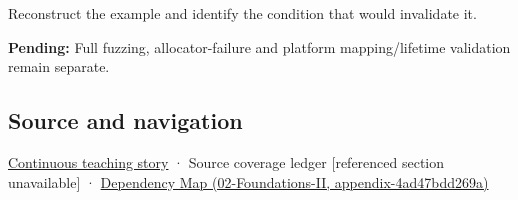 Reconstruct the example and identify the condition that would invalidate it.

\textbf{Pending:} Full fuzzing, allocator-failure and platform mapping/lifetime validation remain separate.

\subsection{Source and navigation}\label{appendix-652d81568de9-source-and-navigation}

\hyperref[01-foundations-i-ch002-bytes-become-a-durable-agreement]{Continuous teaching story} · {Source coverage ledger {[}referenced section unavailable{]}} · \href{../02-Foundations-II/main.pdf\#nameddest=appendix-4ad47bdd269a}{Dependency Map (02-Foundations-II, appendix-4ad47bdd269a)}
